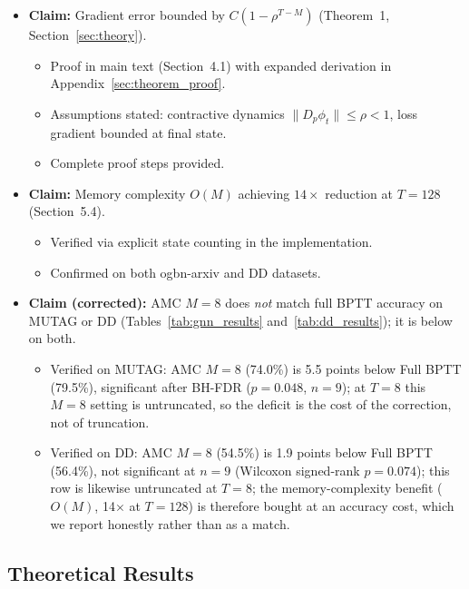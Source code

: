 \documentclass[a4paper,fleqn]{cas-dc}
\begin{document}
\begin{itemize}
    \item \textbf{Claim:} Gradient error bounded by $C(1-\rho^{T-M})$ (Theorem~1, Section~\ref{sec:theory}).
    \begin{itemize}
        \item[\checkmark] Proof in main text (Section~4.1) with expanded derivation in Appendix~\ref{sec:theorem_proof}.
        \item[\checkmark] Assumptions stated: contractive dynamics $\|D_p\phi_t\|\le\rho<1$, loss gradient bounded at final state.
        \item[\checkmark] Complete proof steps provided.
    \end{itemize}
    \item \textbf{Claim:} Memory complexity $O(M)$ achieving $14\times$ reduction at $T{=}128$ (Section~5.4).
    \begin{itemize}
        \item[\checkmark] Verified via explicit state counting in the implementation.
        \item[\checkmark] Confirmed on both ogbn-arxiv and DD datasets.
    \end{itemize}
    \item \textbf{Claim (corrected):} AMC $M{=}8$ does \emph{not} match full BPTT accuracy on MUTAG or DD (Tables~\ref{tab:gnn_results} and~\ref{tab:dd_results}); it is below on both.
    \begin{itemize}
        \item[\checkmark] Verified on MUTAG: AMC $M{=}8$ (74.0\%) is 5.5 points below Full BPTT (79.5\%), significant after BH-FDR ($p{=}0.048$, $n{=}9$); at $T{=}8$ this $M{=}8$ setting is untruncated, so the deficit is the cost of the correction, not of truncation.
        \item[\checkmark] Verified on DD: AMC $M{=}8$ (54.5\%) is 1.9 points below Full BPTT (56.4\%), not significant at $n{=}9$ (Wilcoxon signed-rank $p{=}0.074$); this row is likewise untruncated at $T{=}8$; the memory-complexity benefit ($O(M)$, 14$\times$ at $T{=}128$) is therefore bought at an accuracy cost, which we report honestly rather than as a match.
    \end{itemize}
\end{itemize}

\subsection*{Theoretical Results}
\end{document}
